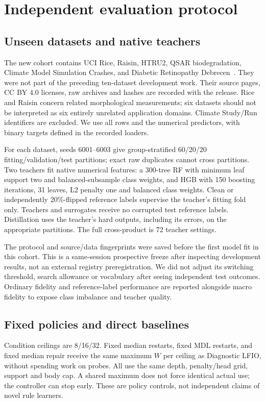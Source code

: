 \documentclass[review,12pt]{elsarticle}
\begin{document}
\section{Independent evaluation protocol}\label{sec:independent-protocol}
\subsection{Unseen datasets and native teachers}

The new cohort contains UCI Rice, Raisin, HTRU2, QSAR biodegradation, Climate Model Simulation Crashes, and Diabetic Retinopathy Debrecen~\citep{rice2019,raisin2020,htru2015,qsar2013,climate2013,retinopathy2014}. They were not part of the preceding ten-dataset development work. Their source pages, CC BY 4.0 licenses, raw archives and hashes are recorded with the release. Rice and Raisin concern related morphological measurements; six datasets should not be interpreted as six entirely unrelated application domains. Climate Study/Run identifiers are excluded. We use all rows and the numerical predictors, with binary targets defined in the recorded loaders.

For each dataset, seeds 6001--6003 give group-stratified 60/20/20 fitting/validation/test partitions; exact raw duplicates cannot cross partitions. Two teachers fit native numerical features: a 300-tree RF with minimum leaf support two and balanced-subsample class weights, and HGB with 150 boosting iterations, 31 leaves, L2 penalty one and balanced class weights. Clean or independently 20\%-flipped reference labels supervise the teacher's fitting fold only. Teachers and surrogates receive no corrupted test reference labels. Distillation uses the teacher's hard outputs, including its errors, on the appropriate partitions. The full cross-product is 72 teacher settings.

The protocol and source/data fingerprints were saved before the first model fit in this cohort. This is a same-session prospective freeze after inspecting development results, not an external registry preregistration. We did not adjust its switching threshold, search allowance or vocabulary after seeing independent test outcomes. Ordinary fidelity and reference-label performance are reported alongside macro fidelity to expose class imbalance and teacher quality.

\subsection{Fixed policies and direct baselines}
Condition ceilings are 8/16/32. Fixed median restarts, fixed MDL restarts, and fixed median repair receive the same maximum $W$ per ceiling as Diagnostic LFIO, without spending work on probes. All use the same depth, penalty/head grid, support and body cap. A shared maximum does not force identical actual use; the controller can stop early. These are policy controls, not independent claims of novel rule learners.
\end{document}
